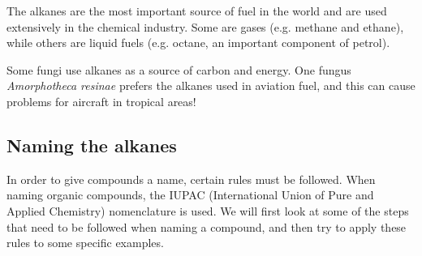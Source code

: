 The alkanes are the most important source of fuel in the world and are used extensively in the chemical industry. Some are gases (e.g. methane and ethane), while others are liquid fuels (e.g. octane, an important component of petrol).

\begin{IFact}{Some fungi use alkanes as a source of carbon and energy. One fungus \textit{Amorphotheca resinae} prefers the alkanes used in aviation fuel, and this can cause problems for aircraft in tropical areas!}
\end{IFact}

\subsection{Naming the alkanes}

In order to give compounds a name, certain rules must be followed. When naming organic compounds, the IUPAC (International Union of Pure and Applied Chemistry) nomenclature is used. We will first look at some of the steps that need to be followed when naming a compound, and then try to apply these rules to some specific examples.

